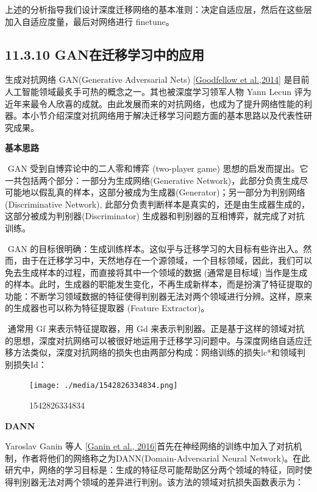 ​
上述的分析指导我们设计深度迁移网络的基本准则：决定自适应层，然后在这些层加入自适应度量，最后对网络进行
finetune。

\subsection{11.3.10
GAN在迁移学习中的应用}\label{ganux5728ux8fc1ux79fbux5b66ux4e60ux4e2dux7684ux5e94ux7528}

生成对抗网络 GAN(Generative Adversarial Nets)
{[}\protect\hyperlink{bookmark256}{Goodfellow et al.,2014}{]}
是目前人工智能领域最炙手可热的概念之一。其也被深度学习领军人物 Yann
Lecun
评为近年来最令人欣喜的成就。由此发展而来的对抗网络，也成为了提升网络性能的利器。本小节介绍深度对抗网络用于解决迁移学习问题方面的基本思路以及代表性研究成果。

\textbf{基本思路}

​ GAN 受到自博弈论中的二人零和博弈 (two-player game)
思想的启发而提出。它一共包括两个部分：一部分为生成网络(Generative
Network)，此部分负责生成尽可能地以假乱真的样本，这部分被成为生成器(Generator)；另一部分为判别网络(Discriminative
Network),
此部分负责判断样本是真实的，还是由生成器生成的，这部分被成为判别器(Discriminator)
生成器和判别器的互相博弈，就完成了对抗训练。

​ GAN
的目标很明确：生成训练样本。这似乎与迁移学习的大目标有些许出入。然而，由于在迁移学习中，天然地存在一个源领域，一个目标领域，因此，我们可以免去生成样本的过程，而直接将其中一个领域的数据
(通常是目标域)
当作是生成的样本。此时，生成器的职能发生变化，不再生成新样本，而是扮演了特征提取的功能：不断学习领域数据的特征使得判别器无法对两个领域进行分辨。这样，原来的生成器也可以称为特征提取器
(Feature Extractor)。

​ 通常用 Gf 来表示特征提取器，用 Gd
来表示判别器。正是基于这样的领域对抗的思想，深度对抗网络可以被很好地运用于迁移学习问题中。与深度网络自适应迁移方法类似，深度对抗网络的损失也由两部分构成：网络训练的损失lc*和领域判别损失Id：

\begin{figure}
\centering
\texttt{[image: ./media/1542826334834.png]}
\caption{1542826334834}
\end{figure}

\textbf{DANN}

Yaroslav Ganin 等人 {[}\protect\hyperlink{bookmark251}{Ganin et al.,
2016}{]}首先在神经网络的训练中加入了对抗机制，作者将他们的网络称之为DANN(Domain-Adversarial
Neural
Network)。在此研宄中，网络的学习目标是：生成的特征尽可能帮助区分两个领域的特征，同时使得判别器无法对两个领域的差异进行判别。该方法的领域对抗损失函数表示为：

